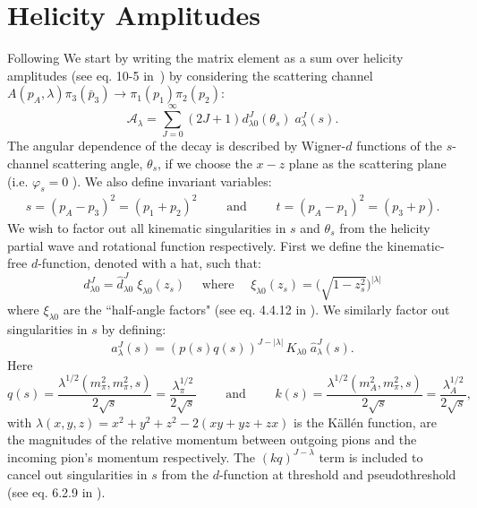 \documentclass[aps,prd,amsmath,amssymb,superscriptaddress,onecolumn,
nofootinbib,showpacs,preprintnumbers]{revtex4-1}
\begin{document}
\section{Helicity Amplitudes}
Following \cite{Mikhasenko:2017rkh} We start by writing the matrix element as a sum over helicity amplitudes (see eq. 10-5 in~\cite{perl}) by considering the scattering channel \(A(p_A, \lambda) \pi_3(\bar{p}_3) \to  \pi_1(p_1)\pi_2(p_2)\):
  \begin{equation}
    \label{eq:helicity}
    \mathcal{A}_\lambda = \sum_{J= 0}^\infty (2J +1) d_{\lambda0}^J(\theta_s) \; a_\lambda^J(s).
  \end{equation}
The angular dependence of the decay is described by Wigner-\(d\) functions of the \(s\)-channel scattering angle, \(\theta_s\), if we choose the \(x-z\) plane as the scattering plane (i.e. \(\varphi_s = 0 \) ). We also define invariant variables:
  \begin{align}
    s = (p_A - p_3)^2 = (p_1 + p_2)^2 \qquad \text{ and } \qquad t = (p_A - p_1)^2 = (p_3 + p).
  \end{align}
We wish to factor out all kinematic singularities in \(s\) and \(\theta_s\) from the helicity partial wave and rotational function respectively. First we define the kinematic-free \(d\)-function, denoted with a hat, such that:
  \begin{equation}
      \label{eq:halfangle}
      d^J_{\lambda 0} = \hat{d}^J_{\lambda 0} \; \xi_{\lambda 0}(z_s) \quad \text{ where } \quad \xi_{\lambda 0}(z_s) = \bigg( \sqrt{ 1- z_s^2} \bigg)^{|\lambda|}
  \end{equation}
where \(\xi_{\lambda 0}\) are the ``half-angle factors" (see eq. 4.4.12 in \cite{Collins}). We similarly factor out singularities in \(s\) by defining:
  \begin{equation}
    \label{eq:kinematicfreepartialwave}
    a^J_\lambda(s) = (p(s)q(s))^{J - |\lambda|} \, K_{\lambda 0} \; \hat{a}^J_\lambda(s).
  \end{equation}
Here
  \begin{equation}
    \label{eq:momenta}
    q(s) = \frac{\lambda^{1/2}(m_\pi^2, m_\pi^2, s)}{2\sqrt{s}} = \frac{\lambda_\pi^{1/2}}{2\sqrt{s}} \qquad \text{ and } \qquad k(s) = \frac{\lambda^{1/2}(m_A^2, m_\pi^2, s)}{2\sqrt{s}} = \frac{\lambda_A^{1/2}}{2\sqrt{s}} ,
  \end{equation}
with \(\lambda(x,y,z) = x^2 + y^2 + z^2 - 2 (xy + yz + zx)\) is the K\"{a}ll\'{e}n function, are the magnitudes of  the relative momentum between outgoing pions and the incoming pion's momentum respectively. The \((kq)^{J-\lambda}\) term is included to cancel out singularities in \(s\) from the \(d\)-function at threshold and pseudothreshold (see eq. 6.2.9 in \cite{Collins}).
\end{document}
